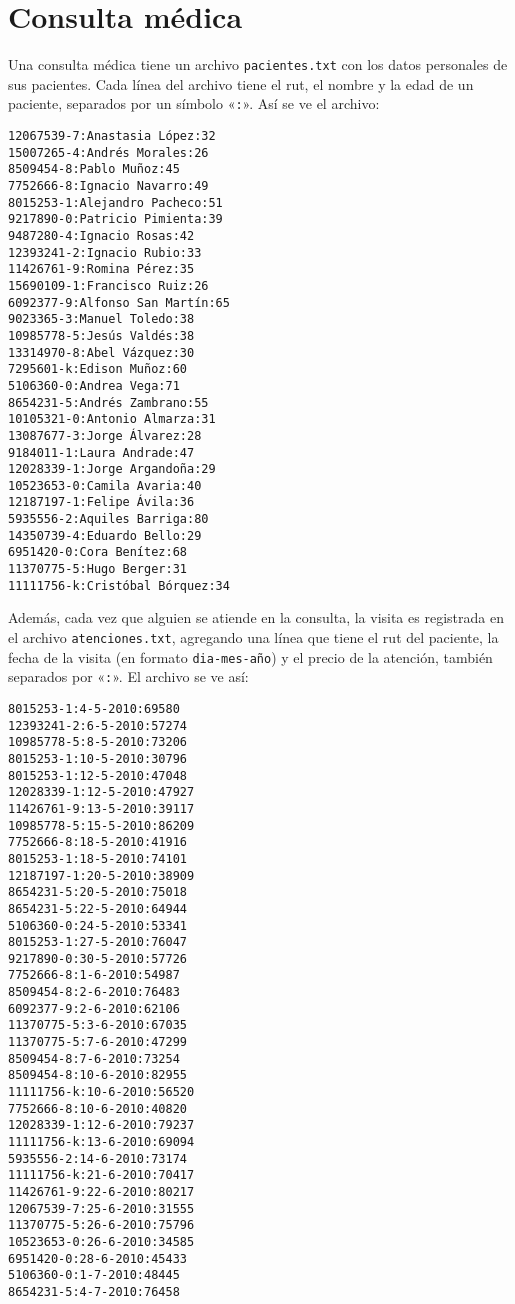\section{Consulta médica}

Una consulta médica tiene un archivo \lstinline!pacientes.txt! con los
datos personales de sus pacientes. Cada línea del archivo tiene el rut,
el nombre y la edad de un paciente, separados por un símbolo
«\lstinline!:!». Así se ve el archivo:

\begin{lstlisting}
12067539-7:Anastasia López:32
15007265-4:Andrés Morales:26
8509454-8:Pablo Muñoz:45
7752666-8:Ignacio Navarro:49
8015253-1:Alejandro Pacheco:51
9217890-0:Patricio Pimienta:39
9487280-4:Ignacio Rosas:42
12393241-2:Ignacio Rubio:33
11426761-9:Romina Pérez:35
15690109-1:Francisco Ruiz:26
6092377-9:Alfonso San Martín:65
9023365-3:Manuel Toledo:38
10985778-5:Jesús Valdés:38
13314970-8:Abel Vázquez:30
7295601-k:Edison Muñoz:60
5106360-0:Andrea Vega:71
8654231-5:Andrés Zambrano:55
10105321-0:Antonio Almarza:31
13087677-3:Jorge Álvarez:28
9184011-1:Laura Andrade:47
12028339-1:Jorge Argandoña:29
10523653-0:Camila Avaria:40
12187197-1:Felipe Ávila:36
5935556-2:Aquiles Barriga:80
14350739-4:Eduardo Bello:29
6951420-0:Cora Benítez:68
11370775-5:Hugo Berger:31
11111756-k:Cristóbal Bórquez:34
\end{lstlisting}

Además, cada vez que alguien se atiende en la consulta, la visita es
registrada en el archivo \lstinline!atenciones.txt!, agregando una línea
que tiene el rut del paciente, la fecha de la visita (en formato
\lstinline!dia-mes-año!) y el precio de la atención, también separados
por «\lstinline!:!». El archivo se ve así:

\begin{lstlisting}
8015253-1:4-5-2010:69580
12393241-2:6-5-2010:57274
10985778-5:8-5-2010:73206
8015253-1:10-5-2010:30796
8015253-1:12-5-2010:47048
12028339-1:12-5-2010:47927
11426761-9:13-5-2010:39117
10985778-5:15-5-2010:86209
7752666-8:18-5-2010:41916
8015253-1:18-5-2010:74101
12187197-1:20-5-2010:38909
8654231-5:20-5-2010:75018
8654231-5:22-5-2010:64944
5106360-0:24-5-2010:53341
8015253-1:27-5-2010:76047
9217890-0:30-5-2010:57726
7752666-8:1-6-2010:54987
8509454-8:2-6-2010:76483
6092377-9:2-6-2010:62106
11370775-5:3-6-2010:67035
11370775-5:7-6-2010:47299
8509454-8:7-6-2010:73254
8509454-8:10-6-2010:82955
11111756-k:10-6-2010:56520
7752666-8:10-6-2010:40820
12028339-1:12-6-2010:79237
11111756-k:13-6-2010:69094
5935556-2:14-6-2010:73174
11111756-k:21-6-2010:70417
11426761-9:22-6-2010:80217
12067539-7:25-6-2010:31555
11370775-5:26-6-2010:75796
10523653-0:26-6-2010:34585
6951420-0:28-6-2010:45433
5106360-0:1-7-2010:48445
8654231-5:4-7-2010:76458
\end{lstlisting}

